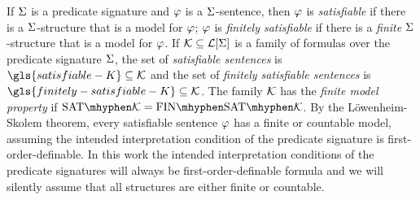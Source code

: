 
If $\mathrm{\Sigma}$ is a predicate signature and $\varphi$ is a $\mathrm{\Sigma}$-sentence, then
$\varphi$ is \emph{satisfiable} if there is a $\mathrm{\Sigma}$-structure that is a model
for $\varphi$; $\varphi$ is \emph{finitely satisfiable} if there is a \emph{finite}
$\mathrm{\Sigma}$-structure that is a model for $\varphi$.
If $\mathcal{K} \subseteq \mathcal{L}[\mathrm{\Sigma}]$ is a family of formulas
over the predicate signature $\mathrm{\Sigma}$, the set of \emph{satisfiable sentences} is
$\gls{satisfiable-K} \subseteq \classFK$ and the set of \emph{finitely
satisfiable sentences} is $\gls{finitely-satisfiable-K} \subseteq \classFK$.
The family $\mathcal{K}$ has the \emph{finite model property} if $\Sat\classFK =
\FinSat\classFK$. By the L\"owenheim-Skolem theorem, every satisfiable sentence 
$\varphi$ has a finite or countable model, assuming the intended interpretation
condition of the predicate signature is first-order-definable.
In this work the intended interpretation conditions of the predicate signatures
will always be first-order-definable formula and we will silently assume that
all structures are either finite or countable.